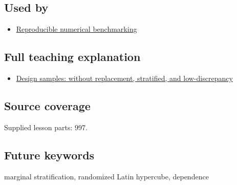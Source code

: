 \subsection{Used by}\label{used-by}

\begin{itemize}
\tightlist
\item
  \hyperref[appendix-b9db93e28371]{Reproducible numerical benchmarking}
\end{itemize}

\subsection{Full teaching explanation}\label{full-teaching-explanation}

\begin{itemize}
\tightlist
\item
  \href{Continuous\%20Notes/Computing\%20Foundations\%20-\%20From\%20Bits\%20to\%20C++\%20and\%20Systems\%20APIs\#Design\%20samples:\%20without\%20replacement,\%20stratified,\%20and\%20low-discrepancy}{Design samples: without replacement, stratified, and low-discrepancy}
\end{itemize}

\subsection{Source coverage}\label{source-coverage}

Supplied lesson parts: 997.

\subsection{Future keywords}\label{future-keywords}

marginal stratification, randomized Latin hypercube, dependence

